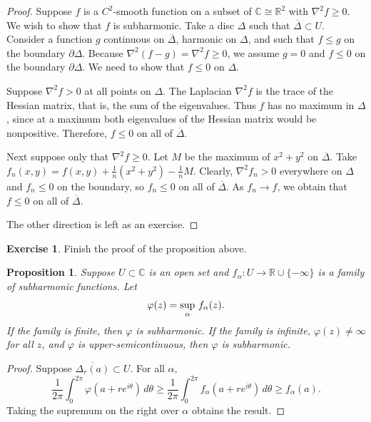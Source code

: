 \documentclass[12pt,openany]{book}
\newcommand{\avoidbreak}{\postdisplaypenalty=100}
\newcommand{\C}{{\mathbb{C}}}
\newcommand{\R}{{\mathbb{R}}}
\theoremstyle{plain}
\newtheorem{prop}[thm]{Proposition}
\theoremstyle{remark}
\theoremstyle{definition}
\newenvironment{exbox}{%
    \def\FrameCommand{\vrule width 1pt \relax\hspace{10pt}}%
    \MakeFramed{\advance\hsize-\width\FrameRestore}%
}{%
    \endMakeFramed
}
\theoremstyle{exercise}
\newtheorem{exercise}{Exercise}[section]
\theoremstyle{example}
\begin{document}
\begin{proof}
Suppose $f$ is a $C^2$-smooth function on a subset of $\C \cong \R^2$
with $\nabla^2 f \geq 0$.  We wish to show that $f$ is subharmonic.
Take a disc $\Delta$ such that $\overline{\Delta} \subset U$.
Consider a function
$g$ continuous on $\overline{\Delta}$,
harmonic on $\Delta$, and such that
$f \leq g$ on the boundary $\partial \Delta$.  Because
$\nabla^2 (f-g) = \nabla^2 f \geq 0$, we assume $g = 0$ and $f \leq 0$
on the boundary $\partial \Delta$.
We need to show that $f \leq 0$ on $\Delta$.

Suppose $\nabla^2 f > 0$ at all points on $\Delta$.
The Laplacian $\nabla^2 f$ is the trace of the Hessian matrix,
that is, the sum of the eigenvalues.  Thus $f$ has no maximum
in $\Delta$, since at a maximum both eigenvalues of the Hessian matrix
would be nonpositive.
Therefore, $f \leq 0$ on all of $\overline{\Delta}$.

Next suppose only that $\nabla^2 f \geq 0$.
Let $M$ be the maximum of $x^2+y^2$ on $\overline{\Delta}$.
Take $f_n(x,y) = f(x,y) + \frac{1}{n}
( x^2+y^2 ) - \frac{1}{n}M$.  Clearly, $\nabla^2 f_n > 0$ everywhere on
$\Delta$ and
$f_n \leq 0$ on the boundary, so $f_n \leq 0$
on all of $\overline{\Delta}$.  As $f_n \to f$, we obtain that
$f \leq 0$ on all of $\overline{\Delta}$.

The other direction is left as an exercise.
\end{proof}

\begin{exbox}
\begin{exercise}
Finish the proof of the proposition above.
\end{exercise}
\end{exbox}

\begin{prop}
\pagebreak[2]%
Suppose $U \subset \C$ is an open set and $f_\alpha \colon U \to \R \cup \{ -\infty \}$
is a family of subharmonic functions.  Let
\begin{equation*}
\varphi(z) = \sup_\alpha\, f_\alpha(z) .
\avoidbreak
\end{equation*}
If the family is finite, then $\varphi$ is subharmonic.
If the family is infinite, $\varphi(z) \neq \infty$ for
all $z$, and $\varphi$
is upper-semicontinuous, then $\varphi$ is subharmonic.
\end{prop}

\begin{proof}
Suppose $\overline{\Delta_r(a)} \subset U$.  For all $\alpha$,
\begin{equation*}
\frac{1}{2\pi} \int_0^{2\pi} \varphi (a+re^{i\theta})\, d\theta
\geq
\frac{1}{2\pi} \int_0^{2\pi} f_\alpha (a+re^{i\theta})\, d\theta
\geq f_\alpha(a) .
\end{equation*}
Taking the supremum on the right over $\alpha$ obtains the result.
\end{proof}
\end{document}
